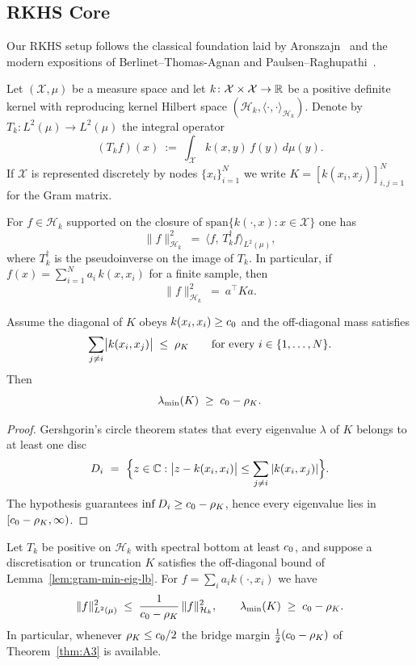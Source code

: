 
\subsection{RKHS Core}\label{sec:rkhs-core}

Our RKHS setup follows the classical foundation laid by Aronszajn~\cite{Aronszajn1950} and the modern expositions of Berlinet--Thomas-Agnan and Paulsen--Raghupathi~\cite{BerlinetThomasAgnan2004,PaulsenRaghupathi2016,Berlinet2004,Paulsen2016}.

Let $(\mathcal X,\mu)$ be a measure space and let $k\colon \mathcal X\times\mathcal X\to \mathbb R$ be a positive definite kernel with reproducing kernel Hilbert space $(\mathcal H_k,\langle\cdot,\cdot\rangle_{\mathcal H_k})$. Denote by $T_k\colon L^2(\mu)\to L^2(\mu)$ the integral operator
\[
  (T_k f)(x)\ :=\ \int_{\mathcal X} k(x,y)\,f(y)\,d\mu(y).
\]
If $\mathcal X$ is represented discretely by nodes $\{x_i\}_{i=1}^N$ we write $K=[k(x_i,x_j)]_{i,j=1}^N$ for the Gram matrix.

\begin{lemma}\label{lem:rkhs-energy}
For $f\in\mathcal H_k$ supported on the closure of $\mathrm{span}\{k(\cdot,x)\colon x\in\mathcal X\}$ one has
\[
  \|f\|_{\mathcal H_k}^2\ =\ \langle f,\,T_k^\dagger f\rangle_{L^2(\mu)},
\]
where $T_k^\dagger$ is the pseudoinverse on the image of $T_k$. In particular, if $f(x)=\sum_{i=1}^N a_i\,k(x,x_i)$ for a finite sample, then
\[
  \|f\|_{\mathcal H_k}^2\ =\ a^\top K a.
\]
\end{lemma}

\begin{lemma}\label{lem:gram-min-eig-lb}
Assume the diagonal of $K$ obeys $k(x_i,x_i)\ge c_0$ and the off-diagonal mass satisfies
\[
  \sum_{j\neq i} \bigl|k(x_i,x_j)\bigr| \;\le\; \rho_K
  \qquad\text{for every } i\in\{1,\dots,N\}.
\]
Then
\[
  \lambda_{\min}(K) \;\ge\; c_0 - \rho_K.
\]
\end{lemma}

\begin{proof}
Gershgorin's circle theorem states that every eigenvalue $\lambda$ of $K$ belongs to at least one disc
\[
  D_i \ =\ \Bigl\{ z\in\CC : \bigl|z-k(x_i,x_i)\bigr| \le \sum_{j\neq i} |k(x_i,x_j)| \Bigr\}.
\]
The hypothesis guarantees $\inf D_i \ge c_0-\rho_K$, hence every eigenvalue lies in $[c_0-\rho_K,\infty)$.
\end{proof}

\begin{proposition}\label{prop:operator-sandwich}
Let $T_k$ be positive on $\mathcal H_k$ with spectral bottom at least $c_0$, and suppose a discretisation or truncation $K$ satisfies the off-diagonal bound of Lemma~\ref{lem:gram-min-eig-lb}. For $f=\sum_i a_i k(\cdot,x_i)$ we have
\[
  \|f\|_{L^2(\mu)}^2 \;\le\; \frac{1}{c_0-\rho_K}\,\|f\|_{\mathcal H_k}^2,
  \qquad
  \lambda_{\min}(K) \;\ge\; c_0-\rho_K.
\]
In particular, whenever $\rho_K\le c_0/2$ the bridge margin $\tfrac12(c_0-\rho_K)$ of Theorem~\ref{thm:A3} is available.
\end{proposition}
\label{a3:lem:weyl_rayleigh_diff}

